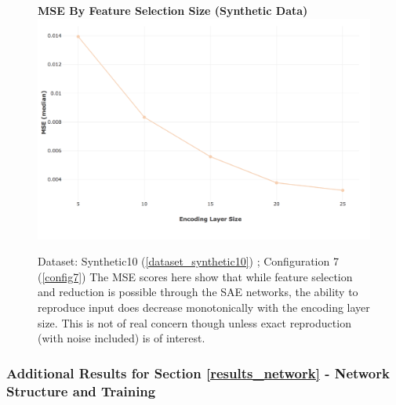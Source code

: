 \documentclass[a4paper,11pt,oneside]{article}
\theoremstyle{plain}
\theoremstyle{definition}
\begin{document}
\begin{figure}[H]
	\centering 
	\textbf{MSE By Feature Selection Size (Synthetic Data)}
	\includegraphics[scale=0.3]{images/results/feature_selection/synth_sae_mse.png} 
	\caption[MSE By Feature Selection Size (Synthetic Data)]{Dataset: Synthetic10 (\ref{dataset_synthetic10}) ; Configuration 7 (\ref{config7})
		\newline The MSE scores here show that while feature selection and reduction is possible through the SAE networks, the ability to reproduce input does decrease monotonically with the encoding layer size. This is not of real concern though unless exact reproduction (with noise included) is of interest.}
	\label{figure-synth_sae_mse}
\end{figure}

\subsubsection{Additional Results for Section \ref{results_network} - Network Structure and Training }\label{results_network_appendix}
\end{document}
